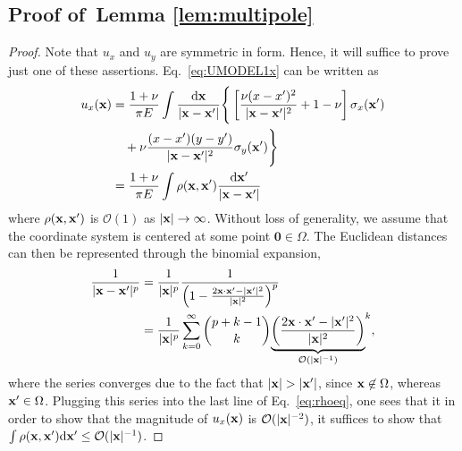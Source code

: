 \documentclass[aps,prl,reprint,twocolumn,groupedaddress,showpacs]{revtex4-1}
\def\dd{\mbox{d}}
\def\x{{\bf x}}
\begin{document}
\subsection{Proof of~Lemma \ref{lem:multipole}}

\begin{proof}
Note that $u_x$ and $u_y$ are symmetric in form. Hence, it will suffice to prove just one of these assertions. Eq.~\ref{eq:UMODEL1x} can be written as
\begin{align}
u_x(\x) &= \frac{1+\nu}{\pi E} \int \frac{\dd \x}{|\x-\x'|} \Bigg\{ \left[ \frac{\nu(x - x')^2}{|\x-\x'|^2} + 1-\nu \right]\sigma_{x}(\x')  \nonumber\\
&\quad+\nu\frac{(x-x')(y-y')}{|\x-\x'|^2} \sigma_y(\x')  \Bigg\} \nonumber\\
&= \frac{1+\nu}{\pi E}   \int \rho(\x,\x')    \frac{\dd \x'}{|\x-\x'|} \label{eq:rhoeq}
\end{align}
where $\rho(\x,\x')$ is $\mathcal{O}(1)$ as $\vert\x\vert\to\infty$. Without loss of generality, we assume that the coordinate system is centered at some point $\mathbf{0}\in\Omega$. The Euclidean distances can then be represented through the binomial expansion,
\begin{align}
\frac{1}{|\x-\x'|^p} &= \frac{1}{|\x|^p}\frac{1}{\left(1 - \frac{2\x\cdot\x' - |\x'|^2}{|\x|^2} \right)^p } \nonumber\\
&= \frac{1}{|\x|^p}\sum_{k=0}^\infty {{p+k-1}\choose{k}} 
{\underbrace{\left(  \frac{2\x\cdot\x' - |\x'|^2}{|\x|^2} \right)}_{\mathcal{O}(|\x|^{-1})}}^k,
\end{align} 
where the series converges due to the fact that $|\x| > |\x'|$, since $\x\not\in\Omega$, whereas $\x'\in\Omega$. Plugging this series into the last line of Eq.~\ref{eq:rhoeq}, one sees that it in order to show that the magnitude of $u_x(\x)$ is $\mathcal{O}(|\x|^{-2})$, it suffices to show that $\int \rho(\x,\x')\dd\x' \leq \mathcal{O}(|\x|^{-1})$.


\end{proof}
\end{document}
